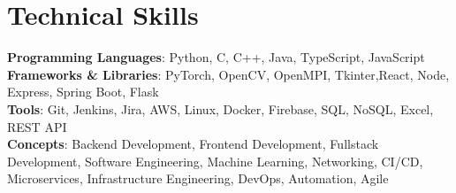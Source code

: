 \documentclass[letterpaper,11pt]{article}
\begin{document}
\section{Technical Skills}
\begin{itemize}[leftmargin=0.15in, label={}]
	\small{\item{
	      \textbf{Programming Languages}{: Python, C, C++, Java, TypeScript, JavaScript} \\
	      \textbf{Frameworks \& Libraries}{: PyTorch, OpenCV, OpenMPI, Tkinter,React, Node, Express, Spring Boot, Flask} \\
	      \textbf{Tools}{: Git, Jenkins, Jira, AWS, Linux, Docker, Firebase, SQL, NoSQL, Excel, REST API} \\
	      \textbf{Concepts}{: Backend Development, Frontend Development, Fullstack Development, Software Engineering, Machine Learning, Networking, CI/CD, Microservices, Infrastructure Engineering, DevOps, Automation, Agile} \\
	      }}
\end{itemize}


\end{document}
